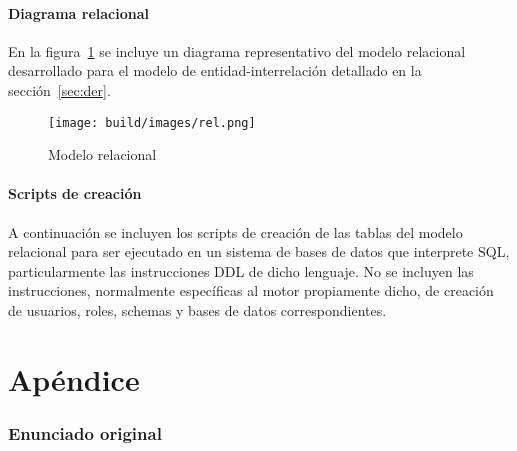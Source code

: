 \documentclass[a4paper,11pt]{article}
\begin{document}
\subsection{Diagrama relacional}

En la figura~\ref{fig:relacional} se incluye un diagrama representativo del
modelo relacional desarrollado para el modelo de entidad-interrelación
detallado en la sección~\ref{sec:der}.

\begin{figure}[h!t]
  \centering
  \texttt{[image: build/images/rel.png]}
  \caption{Modelo relacional} \label{fig:relacional}
\end{figure}

\FloatBarrier

\subsection{Scripts de creación}

A continuación se incluyen los scripts de creación de las tablas del modelo
relacional para ser ejecutado en un sistema de bases de datos que interprete
SQL, particularmente las instrucciones DDL de dicho lenguaje. No se incluyen
las instrucciones, normalmente específicas al motor propiamente dicho, de
creación de usuarios, roles, schemas y bases de datos correspondientes.



\clearpage

\part{Apéndice}
\appendix

\section{Enunciado original}\label{sec:enunciado}

\end{document}
